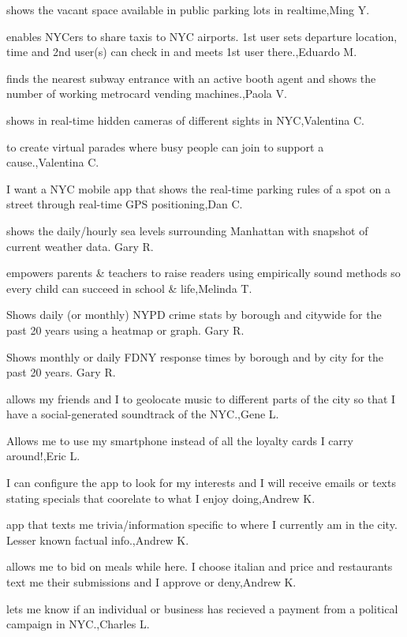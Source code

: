 \documentclass{article}
\begin{document}
 shows the vacant  space available in public parking lots in realtime,Ming Y.

 enables NYCers to share taxis to NYC airports. 1st user sets departure location, time and 2nd user(s) can check in and meets 1st user there.,Eduardo M.

finds the nearest subway entrance with an active booth agent and shows the number of working metrocard vending machines.,Paola V.

shows in real-time hidden cameras of different sights in NYC,Valentina C.

to create virtual parades where busy people can join to support a cause.,Valentina C.

I want a NYC mobile app that shows the real-time parking rules of a spot on a street through real-time GPS positioning,Dan C.

shows the daily/hourly sea levels surrounding Manhattan with snapshot of current weather data. Gary R.

empowers parents \& teachers to raise readers using empirically sound methods so every child can succeed in school  \& life,Melinda T.

Shows daily (or monthly)  NYPD crime stats by borough and citywide for the past 20 years using a heatmap or graph. Gary R.

Shows monthly or daily FDNY response times by borough and by city for the past 20 years. Gary R.

allows my friends and I to geolocate music to different parts of the city so that I have a social-generated soundtrack of the NYC.,Gene L.

Allows me to use my smartphone instead of all the loyalty cards I carry around!,Eric L.

I can configure the app to look for my interests and I will receive emails or texts stating specials that coorelate to what I enjoy doing,Andrew K.

app that texts me trivia/information specific to where I currently am in the city.  Lesser known factual info.,Andrew K.

allows me to bid on meals while here.  I choose italian and price and restaurants text me their submissions and I approve or deny,Andrew K.

lets me know if an individual or business has recieved a payment from a political campaign in NYC.,Charles L.
\end{document}
